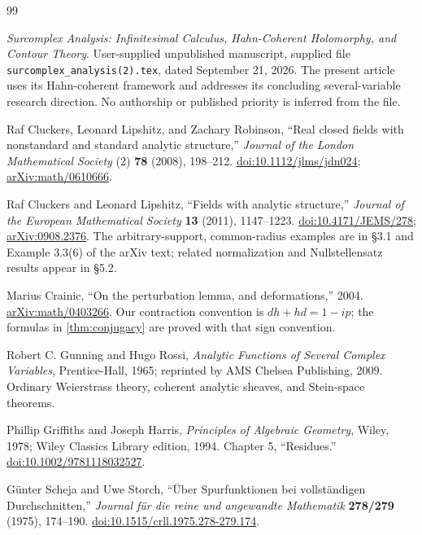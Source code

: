 \documentclass[11pt]{article}
\theoremstyle{definition}
\begin{document}
\begin{thebibliography}{99}

\emph{Surcomplex Analysis: Infinitesimal Calculus, Hahn-Coherent Holomorphy, and Contour Theory}.
User-supplied unpublished manuscript, supplied file
\texttt{surcomplex\_analysis(2).tex}, dated September 21, 2026.
The present article uses its Hahn-coherent framework and addresses its concluding several-variable research direction. No authorship or published priority is inferred from the file.

Raf Cluckers, Leonard Lipshitz, and Zachary Robinson,
``Real closed fields with nonstandard and standard analytic structure,''
\emph{Journal of the London Mathematical Society} (2) \textbf{78} (2008), 198--212.
\href{https://doi.org/10.1112/jlms/jdn024}{doi:10.1112/jlms/jdn024};
\href{https://arxiv.org/abs/math/0610666}{arXiv:math/0610666}.

Raf Cluckers and Leonard Lipshitz,
``Fields with analytic structure,''
\emph{Journal of the European Mathematical Society} \textbf{13} (2011), 1147--1223.
\href{https://doi.org/10.4171/JEMS/278}{doi:10.4171/JEMS/278};
\href{https://arxiv.org/abs/0908.2376}{arXiv:0908.2376}.
The arbitrary-support, common-radius examples are in \S3.1 and Example 3.3(6) of the arXiv text; related normalization and Nullstellensatz results appear in \S5.2.

Marius Crainic,
``On the perturbation lemma, and deformations,'' 2004.
\href{https://arxiv.org/abs/math/0403266}{arXiv:math/0403266}.
Our contraction convention is $dh+hd=1-ip$; the formulas in \cref{thm:conjugacy} are proved with that sign convention.

Robert C. Gunning and Hugo Rossi,
\emph{Analytic Functions of Several Complex Variables},
Prentice-Hall, 1965; reprinted by AMS Chelsea Publishing, 2009.
Ordinary Weierstrass theory, coherent analytic sheaves, and Stein-space theorems.

Phillip Griffiths and Joseph Harris,
\emph{Principles of Algebraic Geometry}, Wiley, 1978; Wiley Classics Library edition, 1994.
Chapter 5, ``Residues.''
\href{https://doi.org/10.1002/9781118032527}{doi:10.1002/9781118032527}.

G\"unter Scheja and Uwe Storch,
``\"Uber Spurfunktionen bei vollst\"andigen Durchschnitten,''
\emph{Journal f\"ur die reine und angewandte Mathematik} \textbf{278/279} (1975), 174--190.
\href{https://doi.org/10.1515/crll.1975.278-279.174}{doi:10.1515/crll.1975.278-279.174}.


\end{thebibliography}
\end{document}
